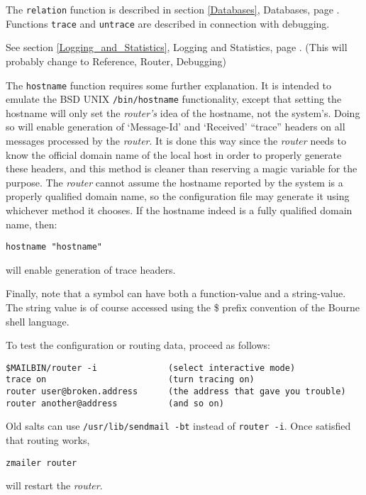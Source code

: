 The {\tt relation} function is described in section
\ref{Databases},  Databases,
page \pageref{Databases}.
Functions {\tt trace} and {\tt untrace} are described
in connection with debugging. 

See section \ref{Logging_and_Statistics}, Logging and Statistics,
page \pageref{Logging_and_Statistics}.
(This will probably change to Reference, Router, Debugging)

The {\tt hostname} function requires some further explanation.
It is intended to emulate the BSD UNIX {\tt /bin/hostname}
functionality, except that setting the hostname will only set
the {\em router's\/} idea of the hostname, not the system's.
Doing so will enable generation of `Message-Id' and `Received'
``trace'' headers on all messages processed by the {\em router\/}.
It is done this way since the {\em router\/} needs to know the official
domain name of the local host in order to properly generate these headers,
and this method is cleaner than reserving a magic variable for the purpose.
The {\em router\/} cannot assume the hostname reported by the system is
a properly qualified domain name, so the configuration file may generate
it using whichever method it chooses.
If the hostname indeed is a fully qualified domain name, then:

\begin{verbatim}
hostname "hostname"
\end{verbatim}


will enable generation of trace headers.

Finally, note that a symbol can have both a function-value and a
string-value.  The string value is of course accessed using the \$ prefix
convention of the Bourne shell language.

To test the configuration or routing data, proceed as follows:

\begin{verbatim}
$MAILBIN/router -i              (select interactive mode)
trace on                        (turn tracing on)
router user@broken.address      (the address that gave you trouble)
router another@address          (and so on)
\end{verbatim}


Old salts can use {\tt /usr/lib/sendmail -bt} instead of {\tt router -i}. Once satisfied that routing works,

\begin{verbatim}
zmailer router
\end{verbatim}


will restart the {\em router\/}.

